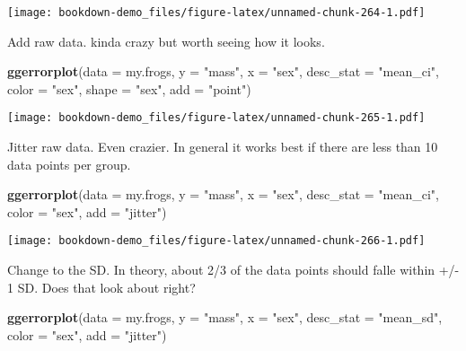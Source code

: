 \documentclass[]{book}
\newenvironment{Shaded}{\begin{snugshade}}{\end{snugshade}}
\newcommand{\KeywordTok}[1]{\textcolor[rgb]{0.13,0.29,0.53}{\textbf{#1}}}
\newcommand{\DataTypeTok}[1]{\textcolor[rgb]{0.13,0.29,0.53}{#1}}
\newcommand{\StringTok}[1]{\textcolor[rgb]{0.31,0.60,0.02}{#1}}
\newcommand{\NormalTok}[1]{#1}
\theoremstyle{definition}
\theoremstyle{definition}
\theoremstyle{definition}
\theoremstyle{remark}
\begin{document}
\texttt{[image: bookdown-demo\_files/figure-latex/unnamed-chunk-264-1.pdf]}

Add raw data. kinda crazy but worth seeing how it looks.

\begin{Shaded}
\begin{Highlighting}[]
\KeywordTok{ggerrorplot}\NormalTok{(}\DataTypeTok{data =}\NormalTok{ my.frogs,}
          \DataTypeTok{y =} \StringTok{"mass"}\NormalTok{,}
          \DataTypeTok{x =} \StringTok{"sex"}\NormalTok{,}
          \DataTypeTok{desc_stat =} \StringTok{"mean_ci"}\NormalTok{,}
          \DataTypeTok{color =} \StringTok{"sex"}\NormalTok{,}
          \DataTypeTok{shape =} \StringTok{"sex"}\NormalTok{,}
          \DataTypeTok{add =} \StringTok{"point"}\NormalTok{)}
\end{Highlighting}
\end{Shaded}

\texttt{[image: bookdown-demo\_files/figure-latex/unnamed-chunk-265-1.pdf]}

Jitter raw data. Even crazier. In general it works best if there are
less than 10 data points per group.

\begin{Shaded}
\begin{Highlighting}[]
\KeywordTok{ggerrorplot}\NormalTok{(}\DataTypeTok{data =}\NormalTok{ my.frogs,}
          \DataTypeTok{y =} \StringTok{"mass"}\NormalTok{,}
          \DataTypeTok{x =} \StringTok{"sex"}\NormalTok{,}
          \DataTypeTok{desc_stat =} \StringTok{"mean_ci"}\NormalTok{,}
          \DataTypeTok{color =} \StringTok{"sex"}\NormalTok{,}
          \DataTypeTok{add =} \StringTok{"jitter"}\NormalTok{)}
\end{Highlighting}
\end{Shaded}

\texttt{[image: bookdown-demo\_files/figure-latex/unnamed-chunk-266-1.pdf]}

Change to the SD. In theory, about 2/3 of the data points should falle
within +/- 1 SD. Does that look about right?

\begin{Shaded}
\begin{Highlighting}[]
\KeywordTok{ggerrorplot}\NormalTok{(}\DataTypeTok{data =}\NormalTok{ my.frogs,}
          \DataTypeTok{y =} \StringTok{"mass"}\NormalTok{,}
          \DataTypeTok{x =} \StringTok{"sex"}\NormalTok{,}
          \DataTypeTok{desc_stat =} \StringTok{"mean_sd"}\NormalTok{,}
          \DataTypeTok{color =} \StringTok{"sex"}\NormalTok{,}
          \DataTypeTok{add =} \StringTok{"jitter"}\NormalTok{)}
\end{Highlighting}
\end{Shaded}
\end{document}
